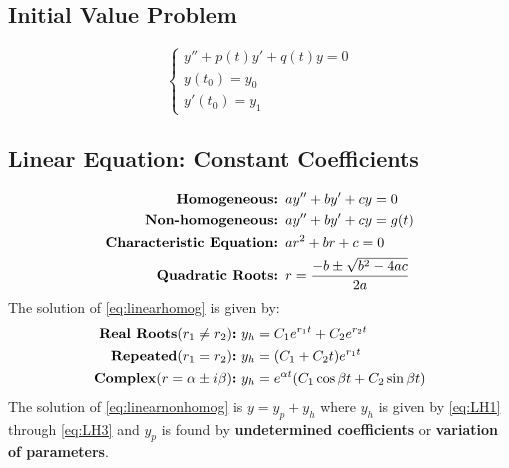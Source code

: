 \documentclass[10pt,leqno]{article}
\begin{document}
\begin{multicols}{2}
\subsection*{Initial Value Problem}
\begin{equation}
\left\{
\begin{array}{l}
y''+p(t)y'+q(t)y=0\\ y(t_0)=y_0 \\ y'(t_0)=y_1
\end{array} 
\right.
\end{equation}



\subsection*{Linear Equation: Constant Coefficients} 
\begin{align}
\text{\textbf{Homogeneous: }} &ay'' + by' + cy=0 \label{eq:linearhomog}\\
\text{\textbf{Non-homogeneous: }} &ay''+by'+cy = g(t)\label{eq:linearnonhomog}\\
\text{\textbf{Characteristic Equation: }} &ar^2 + br + c=0\label{eq:characteristiceq}\\
\text{\textbf{Quadratic Roots: }} &r=\frac{-b\pm\sqrt{b^2-4ac}}{2a}
\end{align}
The solution of \eqref{eq:linearhomog} is given by: 
\begin{align}
\text{\textbf{Real Roots$(r_1 \neq r_2)$:}}\  & y_h = C_1 e^{r_1 t} + C_2 e^{r_2t} \label{eq:LH1}\\
\text{\textbf{Repeated$(r_1 = r_2)$:}}\  & y_h = (C_1 + C_2 t)e^{r_1t}\label{eq:LH2}\\
\text{\textbf{Complex$(r=\alpha\pm i\beta)$:}}\ & y_h=e^{\alpha t}(C_1 \cos \beta t + C_2 \sin \beta t) \label{eq:LH3}
\end{align}
The solution of \eqref{eq:linearnonhomog} is $y=y_p+y_h$ where $y_h$ is given by \eqref{eq:LH1} through \eqref{eq:LH3} and $y_p$ is found by \textbf{undetermined coefficients} or \textbf{variation of parameters}.



\end{multicols}
\end{document}
